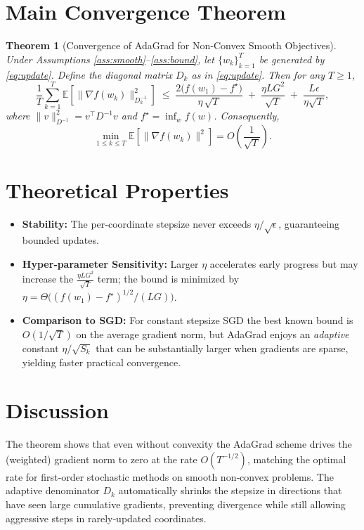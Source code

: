 \documentclass{article}
\newtheorem{theorem}{Theorem}
\newcommand{\E}{\mathbb{E}}
\begin{document}
\section*{Main Convergence Theorem}
\begin{theorem}[Convergence of AdaGrad for Non‑Convex Smooth Objectives]
\label{thm:convergence}
Under Assumptions \ref{ass:smooth}–\ref{ass:bound}, let $\{w_{k}\}_{k=1}^{T}$ be generated by \eqref{eq:update}. Define the diagonal matrix $D_{k}$ as in \eqref{eq:update}. Then for any $T\ge1$,
\[
\frac{1}{T}\sum_{k=1}^{T}\E\!\left[\big\|\nabla f(w_{k})\big\|_{D_{k}^{-1}}^{2}\right]
\;\le\;
\frac{2\big(f(w_{1})-f^{\star}\big)}{\eta\,\sqrt{T}} \;+\;
\frac{\eta L G^{2}}{\sqrt{T}} \;+\; \frac{L\epsilon}{\eta\sqrt{T}},
\tag{T1}
\]
where $\|v\|_{D^{-1}}^{2}=v^{\top}D^{-1}v$ and $f^{\star}=\inf_{w}f(w)$. Consequently,
\[
\min_{1\le k\le T}\E\!\left[\big\|\nabla f(w_{k})\big\|^{2}\right]
=O\!\left(\frac{1}{\sqrt{T}}\right).
\]
\end{theorem}

\section*{Theoretical Properties}
\begin{itemize}
    \item \textbf{Stability:} The per‑coordinate stepsize never exceeds $\eta/\sqrt{\epsilon}$, guaranteeing bounded updates.
    \item \textbf{Hyper‑parameter Sensitivity:} Larger $\eta$ accelerates early progress but may increase the $\frac{\eta L G^{2}}{\sqrt{T}}$ term; the bound is minimized by $\eta=\Theta\!\big((f(w_{1})-f^{\star})^{1/2}/(LG)\big)$.
    \item \textbf{Comparison to SGD:} For constant stepsize SGD the best known bound is $O(1/\sqrt{T})$ on the average gradient norm, but AdaGrad enjoys an \emph{adaptive} constant $\eta/\sqrt{S_{k}}$ that can be substantially larger when gradients are sparse, yielding faster practical convergence.
\end{itemize}

\section*{Discussion}
The theorem shows that even without convexity the AdaGrad scheme drives the (weighted) gradient norm to zero at the rate $O(T^{-1/2})$, matching the optimal rate for first‑order stochastic methods on smooth non‑convex problems. The adaptive denominator $D_{k}$ automatically shrinks the stepsize in directions that have seen large cumulative gradients, preventing divergence while still allowing aggressive steps in rarely‑updated coordinates.
\end{document}
